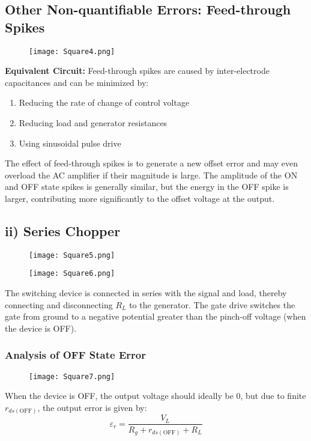 \documentclass[a4paper,9pt,twoside,openany,twocolumn]{memoir}
\begin{document}
\subsection*{Other Non-quantifiable Errors: Feed-through Spikes}
\begin{figure}[h]
    \centering
    \texttt{[image: Square4.png]}
    \caption{}
\end{figure}
\textbf{Equivalent Circuit:}  
Feed-through spikes are caused by inter-electrode capacitances and can be minimized by:
\begin{enumerate}
    \item Reducing the rate of change of control voltage
    \item Reducing load and generator resistances
    \item Using sinusoidal pulse drive
\end{enumerate}

The effect of feed-through spikes is to generate a new offset error and may even overload the AC amplifier if their magnitude is large. The amplitude of the ON and OFF state spikes is generally similar, but the energy in the OFF spike is larger, contributing more significantly to the offset voltage at the output.

\subsection*{ii) Series Chopper}
\begin{figure}[h]
    \centering
    \begin{minipage}{0.4\textwidth}
        \centering
        \texttt{[image: Square5.png]}
        \caption{}
    \end{minipage}%
    \hfill
    \begin{minipage}{0.4\textwidth}
        \centering
        \texttt{[image: Square6.png]}
        \caption{}
    \end{minipage}
\end{figure}
The switching device is connected in series with the signal and load, thereby connecting and disconnecting \( R_L \) to the generator. The gate drive switches the gate from ground to a negative potential greater than the pinch-off voltage (when the device is OFF).

\subsubsection*{Analysis of OFF State Error}
\begin{figure}[h]
    \centering
    \texttt{[image: Square7.png]}
    \caption{}
\end{figure}
When the device is OFF, the output voltage should ideally be 0, but due to finite \( r_{ds(\text{OFF})} \), the output error is given by:
\[
\varepsilon_r = \frac{V_L}{R_g + r_{ds(\text{OFF})} + R_L}
\]
\end{document}
